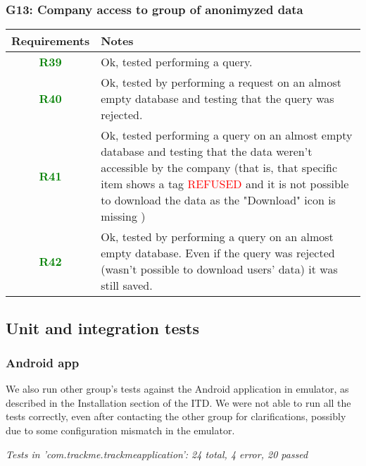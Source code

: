 \subsubsection{G13: Company access to group of anonimyzed data}
  \begin{adjustwidth}{1cm}{}
        \begin{longtable}{|c|p{}|}
            \hline
            \textbf{Requirements} & \textbf{Notes} \\
            \hline
            \textbf{\textcolor{green}{R39}} & Ok, tested performing a query. \\
            \hline
            \textbf{\textcolor{green}{R40}} & Ok, tested by performing a request on an almost empty database and testing that the query was rejected.  \\
            \hline
            \textbf{\textcolor{green}{R41}} & Ok, tested performing a query on an almost empty database and testing that the data weren't accessible by the company (that is, that specific item shows a tag \textcolor{red}{REFUSED} and it is not possible to download the data as the "Download" icon is missing )  \\
            \hline
            \textbf{\textcolor{green}{R42}} & Ok, tested by performing a query on an almost empty database. Even if the query was rejected (wasn't possible to download users' data) it was still saved.  \\
            \hline
            
            
            
        \end{longtable}
    \end{adjustwidth}

\subsection{Unit and integration tests}
\subsubsection{Android app}
We also run other group's tests against the Android application in emulator, as described in the Installation section of the ITD. We were not able to run all the tests correctly, even after contacting the other group for clarifications, possibly due to some configuration mismatch in the emulator.

\noindent\textit{Tests in 'com.trackme.trackmeapplication': 24 total, 4 error, 20 passed}

